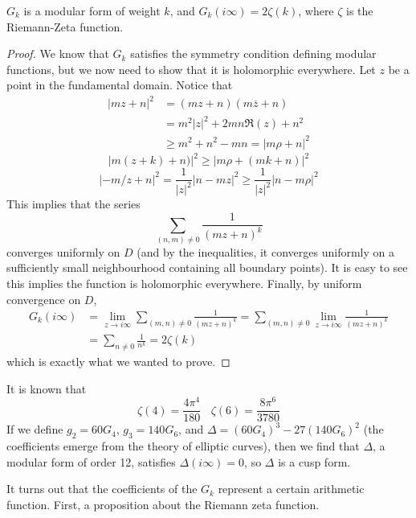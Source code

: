 \begin{theorem}
    $G_k$ is a modular form of weight $k$, and $G_k(i \infty) = 2 \zeta(k)$, where $\zeta$ is the Riemann-Zeta function.
\end{theorem}
\begin{proof}
    We know that $G_k$ satisfies the symmetry condition defining modular functions, but we now need to show that it is holomorphic everywhere. Let $z$ be a point in the fundamental domain. Notice that
    \begin{align*}
        |mz + n|^2 &= (mz + n)(m \overline{z} + n)\\
        &= m^2 |z|^2 + 2mn \Re(z) + n^2\\
        &\geq m^2 + n^2 - mn = |m \rho + n|^2
    \end{align*}
    \[ |m(z + k) + n)|^2 \geq |m \rho + (mk+n)|^2 \]
    \[ |-m/z + n|^2 = \frac{1}{|z|^2} |n - mz|^2 \geq \frac{1}{|z|^2} |n - m \rho|^2 \]
    This implies that the series
    \[ \sum_{(n,m) \neq 0} \frac{1}{(mz + n)^{k}} \]
    converges uniformly on $D$ (and by the inequalities, it converges uniformly on a sufficiently small neighbourhood containing all boundary points). It is easy to see this implies the function is holomorphic everywhere. Finally, by uniform convergence on $D$,
    \begin{align*}
        G_k(i \infty) &= \lim_{z \to i \infty} \sum_{(m,n) \neq 0} \frac{1}{(mz + n)^{k}} = \sum_{(m,n) \neq 0} \lim_{z \to i \infty} \frac{1}{(mz + n)^{k}}\\
        &= \sum_{n \neq 0} \frac{1}{n^{k}} = 2 \zeta(k)
    \end{align*}
    which is exactly what we wanted to prove.
\end{proof}

\begin{example}
    It is known that
    \[ \zeta(4) = \frac{4 \pi^4}{180}\ \ \ \ \zeta(6) = \frac{8 \pi^6}{3780} \]
    If we define $g_2 = 60 G_4$, $g_3 = 140 G_6$, and $\Delta = (60 G_4)^3 - 27 (140 G_6)^2$ (the coefficients emerge from the theory of elliptic curves), then we find that $\Delta$, a modular form of order 12, satisfies $\Delta(i \infty) = 0$, so $\Delta$ is a cusp form.
\end{example}

It turns out that the coefficients of the $G_k$ represent a certain arithmetic function. First, a proposition about the Riemann zeta function.

